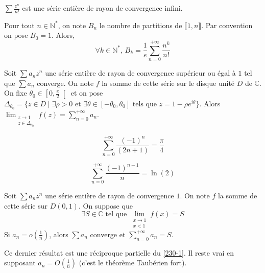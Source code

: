 	\begin{example}
		$\sum \frac{z^n}{n!}$ est une série entière de rayon de convergence infini.
	\end{example}


	\begin{theorem}
		Pour tout $n \in \mathbb{N}^*$, on note $B_n$ le nombre de partitions de $\llbracket 1, n \rrbracket$. Par convention on pose $B_0 = 1$. Alors,
		\[ \forall k \in \mathbb{N}^*, \, B_k = \frac{1}{e} \sum_{n=0}^{+\infty} \frac{n^k}{n!} \]
	\end{theorem}


	\begin{theorem}
		\label{230-1}
		Soit $\sum a_n z^n$ une série entière de rayon de convergence supérieur ou égal à $1$ tel que $\sum a_n$ converge. On note $f$ la somme de cette série sur le disque unité $D$ de $\mathbb{C}$. On fixe $\theta_0 \in \left[ 0, \frac{\pi}{2} \right[$ et on pose $\Delta_{\theta_0} = \{ z \in D \mid \exists \rho > 0 \text{ et } \exists \theta \in [-\theta_0, \theta_0] \text{ tels que } z = 1 - \rho e^{i\theta} \}$.
		\newpar
		Alors $\lim_{\substack{z \rightarrow 1 \\ z \in \Delta_{\theta_0}}} f(z) = \sum_{n=0}^{+\infty} a_n$.
	\end{theorem}

	\begin{application}
		\[ \sum_{n=0}^{+\infty} \frac{(-1)^n}{(2n+1)} = \frac{\pi}{4} \]
	\end{application}

	\begin{application}
		\[ \sum_{n=0}^{+\infty} \frac{(-1)^{n-1}}{n} = \ln(2) \]
	\end{application}

	\begin{theorem}
		Soit $\sum a_n z^n$ une série entière de rayon de convergence $1$. On note $f$ la somme de cette série sur $D(0,1)$. On suppose que
		\[ \exists S \in \mathbb{C} \text{ tel que } \lim_{\substack{x \rightarrow 1 \\ x < 1}} f(x) = S \]
		Si $a_n = o \left( \frac{1}{n} \right)$, alors $\sum a_n$ converge et $\sum_{n=0}^{+\infty} a_n = S$.
	\end{theorem}

	\begin{remark}
		Ce dernier résultat est une réciproque partielle du \cref{230-1}. Il reste vrai en supposant $a_n = O \left( \frac{1}{n} \right)$ (c'est le théorème Taubérien fort).
	\end{remark}

